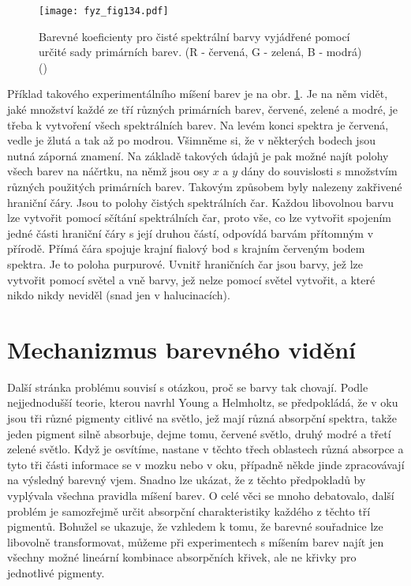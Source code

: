     \begin{figure}[ht!]  %
      \centering
      \texttt{[image: fyz\_fig134.pdf]}
      \caption{Barevné koeficienty pro čisté spektrální barvy vyjádřené pomocí určité sady
               primárních barev. (R - červená, G - zelená, B - modrá)
              (\cite[s.~475]{Feynman01})}
      \label{fyz:fig134}
    \end{figure}
    Příklad takového experimentálního míšení barev je na obr. \ref{fyz:fig134}. Je na něm vidět, 
    jaké množství každé ze tří různých primárních barev, červené, zelené a modré, je třeba k 
    vytvoření všech spektrálních barev. Na levém konci spektra je červená, vedle je žlutá a tak až 
    po modrou. Všimněme si, že v některých bodech jsou nutná záporná znamení. Na základě takových 
    údajů je pak možné najít polohy všech barev na náčrtku, na němž jsou osy \(x\) a \(y\) dány do 
    souvislosti s množstvím různých použitých primárních barev. Takovým způsobem byly nalezeny 
    zakřivené hraniční čáry. Jsou to polohy čistých spektrálních čar. Každou libovolnou barvu lze 
    vytvořit pomocí sčítání spektrálních čar, proto vše, co lze vytvořit spojením jedné části 
    hraniční čáry s její druhou částí, odpovídá barvám přítomným v přírodě. Přímá čára spojuje 
    krajní fialový bod s krajním červeným bodem spektra. Je to poloha purpurové. Uvnitř hraničních 
    čar jsou barvy, jež lze vytvořit pomocí světel a vně barvy, jež nelze pomocí světel vytvořit, a 
    které nikdo nikdy neviděl (snad jen v halucinacích).
    
  \section{Mechanizmus barevného vidění}\label{fyz:IchapXXXVsecV}

    Další stránka problému souvisí s otázkou, proč se barvy tak chovají. Podle nejjednodušší 
    teorie, kterou navrhl Young a Helmholtz, se předpokládá, že v oku jsou tři různé pigmenty 
    citlivé na světlo, jež mají různá absorpční spektra, takže jeden pigment silně absorbuje, dejme 
    tomu, červené světlo, druhý modré a třetí zelené světlo. Když je osvítíme, nastane v těchto 
    třech oblastech různá absorpce a tyto tři části informace se v mozku nebo v oku, případně někde 
    jinde zpracovávají na výsledný barevný vjem. Snadno lze ukázat, že z těchto předpokladů by 
    vyplývala všechna pravidla míšení barev. O celé věci se mnoho debatovalo, další problém je 
    samozřejmě určit absorpční charakteristiky každého z těchto tří pigmentů. Bohužel se ukazuje, 
    že vzhledem k tomu, že barevné souřadnice lze libovolně transformovat, můžeme při experimentech 
    s míšením barev najít jen všechny možné lineární kombinace absorpčních křivek, ale ne křivky 
    pro jednotlivé pigmenty. 
    
